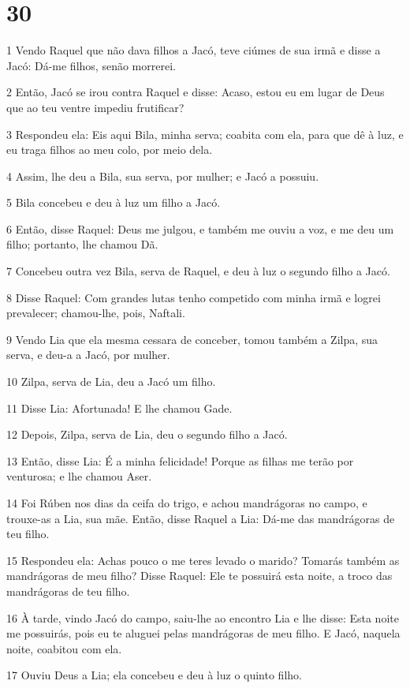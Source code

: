\chapter{30}

\par 1 Vendo Raquel que não dava filhos a Jacó, teve ciúmes de sua irmã e disse a Jacó: Dá-me filhos, senão morrerei.
\par 2 Então, Jacó se irou contra Raquel e disse: Acaso, estou eu em lugar de Deus que ao teu ventre impediu frutificar?
\par 3 Respondeu ela: Eis aqui Bila, minha serva; coabita com ela, para que dê à luz, e eu traga filhos ao meu colo, por meio dela.
\par 4 Assim, lhe deu a Bila, sua serva, por mulher; e Jacó a possuiu.
\par 5 Bila concebeu e deu à luz um filho a Jacó.
\par 6 Então, disse Raquel: Deus me julgou, e também me ouviu a voz, e me deu um filho; portanto, lhe chamou Dã.
\par 7 Concebeu outra vez Bila, serva de Raquel, e deu à luz o segundo filho a Jacó.
\par 8 Disse Raquel: Com grandes lutas tenho competido com minha irmã e logrei prevalecer; chamou-lhe, pois, Naftali.
\par 9 Vendo Lia que ela mesma cessara de conceber, tomou também a Zilpa, sua serva, e deu-a a Jacó, por mulher.
\par 10 Zilpa, serva de Lia, deu a Jacó um filho.
\par 11 Disse Lia: Afortunada! E lhe chamou Gade.
\par 12 Depois, Zilpa, serva de Lia, deu o segundo filho a Jacó.
\par 13 Então, disse Lia: É a minha felicidade! Porque as filhas me terão por venturosa; e lhe chamou Aser.
\par 14 Foi Rúben nos dias da ceifa do trigo, e achou mandrágoras no campo, e trouxe-as a Lia, sua mãe. Então, disse Raquel a Lia: Dá-me das mandrágoras de teu filho.
\par 15 Respondeu ela: Achas pouco o me teres levado o marido? Tomarás também as mandrágoras de meu filho? Disse Raquel: Ele te possuirá esta noite, a troco das mandrágoras de teu filho.
\par 16 À tarde, vindo Jacó do campo, saiu-lhe ao encontro Lia e lhe disse: Esta noite me possuirás, pois eu te aluguei pelas mandrágoras de meu filho. E Jacó, naquela noite, coabitou com ela.
\par 17 Ouviu Deus a Lia; ela concebeu e deu à luz o quinto filho.
